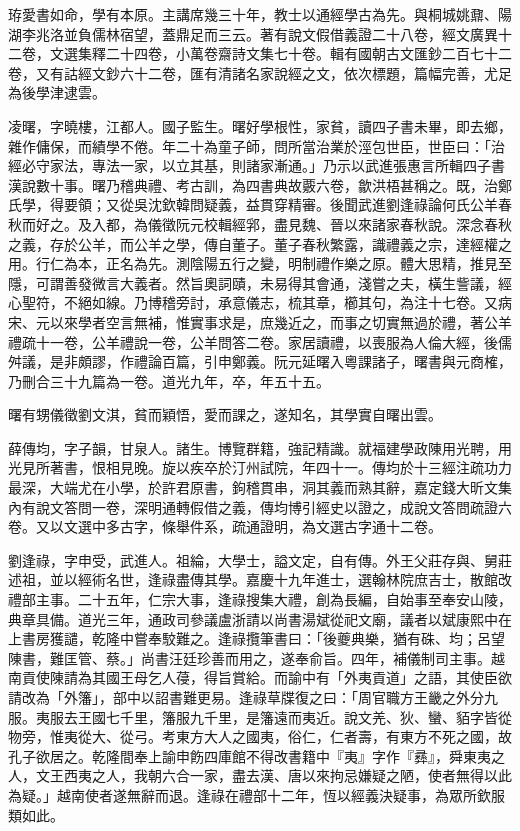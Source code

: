 \begin{pinyinscope}
珔愛書如命，學有本原。主講席幾三十年，教士以通經學古為先。與桐城姚鼐、陽湖李兆洛並負儒林宿望，蓋鼎足而三云。著有說文假借義證二十八卷，經文廣異十二卷，文選集釋二十四卷，小萬卷齋詩文集七十卷。輯有國朝古文匯鈔二百七十二卷，又有詁經文鈔六十二卷，匯有清諸名家說經之文，依次標題，篇幅完善，尤足為後學津逮雲。

凌曙，字曉樓，江都人。國子監生。曙好學根性，家貧，讀四子書未畢，即去鄉，雜作傭保，而績學不倦。年二十為童子師，問所當治業於涇包世臣，世臣曰：「治經必守家法，專法一家，以立其基，則諸家漸通。」乃示以武進張惠言所輯四子書漢說數十事。曙乃稽典禮、考古訓，為四書典故覈六卷，歙洪梧甚稱之。既，治鄭氏學，得要領；又從吳沈欽韓問疑義，益貫穿精審。後聞武進劉逢祿論何氏公羊春秋而好之。及入都，為儀徵阮元校輯經郛，盡見魏、晉以來諸家春秋說。深念春秋之義，存於公羊，而公羊之學，傳自董子。董子春秋繁露，識禮義之宗，達經權之用。行仁為本，正名為先。測陰陽五行之變，明制禮作樂之原。體大思精，推見至隱，可謂善發微言大義者。然旨奧詞賾，未易得其會通，淺嘗之夫，橫生訾議，經心聖符，不絕如線。乃博稽旁討，承意儀志，梳其章，櫛其句，為注十七卷。又病宋、元以來學者空言無補，惟實事求是，庶幾近之，而事之切實無過於禮，著公羊禮疏十一卷，公羊禮說一卷，公羊問答二卷。家居讀禮，以喪服為人倫大經，後儒舛議，是非頗謬，作禮論百篇，引申鄭義。阮元延曙入粵課諸子，曙書與元商榷，乃刪合三十九篇為一卷。道光九年，卒，年五十五。

曙有甥儀徵劉文淇，貧而穎悟，愛而課之，遂知名，其學實自曙出雲。

薛傳均，字子韻，甘泉人。諸生。博覽群籍，強記精識。就福建學政陳用光聘，用光見所著書，恨相見晚。旋以疾卒於汀州試院，年四十一。傳均於十三經注疏功力最深，大端尤在小學，於許君原書，鉤稽貫串，洞其義而熟其辭，嘉定錢大昕文集內有說文答問一卷，深明通轉假借之義，傳均博引經史以證之，成說文答問疏證六卷。又以文選中多古字，條舉件系，疏通證明，為文選古字通十二卷。

劉逢祿，字申受，武進人。祖綸，大學士，謚文定，自有傳。外王父莊存與、舅莊述祖，並以經術名世，逢祿盡傳其學。嘉慶十九年進士，選翰林院庶吉士，散館改禮部主事。二十五年，仁宗大事，逢祿搜集大禮，創為長編，自始事至奉安山陵，典章具備。道光三年，通政司參議盧浙請以尚書湯斌從祀文廟，議者以斌康熙中在上書房獲譴，乾隆中嘗奉駮難之。逢祿攬筆書曰：「後夔典樂，猶有硃、均；呂望陳書，難匡管、蔡。」尚書汪廷珍善而用之，遂奉俞旨。四年，補儀制司主事。越南貢使陳請為其國王母乞人葠，得旨賞給。而諭中有「外夷貢道」之語，其使臣欲請改為「外籓」，部中以詔書難更易。逢祿草牒復之曰：「周官職方王畿之外分九服。夷服去王國七千里，籓服九千里，是籓遠而夷近。說文羌、狄、蠻、貊字皆從物旁，惟夷從大、從弓。考東方大人之國夷，俗仁，仁者壽，有東方不死之國，故孔子欲居之。乾隆間奉上諭申飭四庫館不得改書籍中『夷』字作『彞』，舜東夷之人，文王西夷之人，我朝六合一家，盡去漢、唐以來拘忌嫌疑之陋，使者無得以此為疑。」越南使者遂無辭而退。逢祿在禮部十二年，恆以經義決疑事，為眾所欽服類如此。


\end{pinyinscope}
